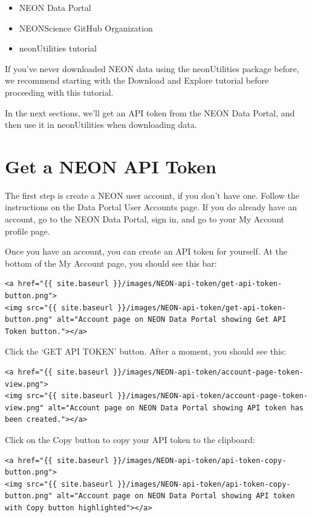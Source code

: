 \documentclass[]{book}
\providecommand{\tightlist}{%
  \setlength{\itemsep}{0pt}\setlength{\parskip}{0pt}}
\begin{document}
\begin{itemize}
\tightlist
\item
  NEON Data Portal 
\item
  NEONScience GitHub Organization
\item
  neonUtilities tutorial
\end{itemize}

If you've never downloaded NEON data using the neonUtilities package before,
we recommend starting with the Download and Explore tutorial before proceeding with this tutorial.

In the next sections, we'll get an API token from the NEON Data Portal, and
then use it in neonUtilities when downloading data.

\hypertarget{get-a-neon-api-token}{%
\section{Get a NEON API Token}\label{get-a-neon-api-token}}

The first step is create a NEON user account, if you don't have one.
Follow the instructions on the Data Portal User Accounts page. If you do already
have an account, go to the NEON Data Portal,
sign in, and go to your My Account profile page.

Once you have an account, you can create an API token for yourself. At
the bottom of the My Account page, you should see this bar:

\begin{verbatim}
<a href="{{ site.baseurl }}/images/NEON-api-token/get-api-token-button.png">
<img src="{{ site.baseurl }}/images/NEON-api-token/get-api-token-button.png" alt="Account page on NEON Data Portal showing Get API Token button."></a>
\end{verbatim}

Click the `GET API TOKEN' button. After a moment, you should see this:

\begin{verbatim}
<a href="{{ site.baseurl }}/images/NEON-api-token/account-page-token-view.png">
<img src="{{ site.baseurl }}/images/NEON-api-token/account-page-token-view.png" alt="Account page on NEON Data Portal showing API token has been created."></a>
\end{verbatim}

Click on the Copy button to copy your API token to the clipboard:

\begin{verbatim}
<a href="{{ site.baseurl }}/images/NEON-api-token/api-token-copy-button.png">
<img src="{{ site.baseurl }}/images/NEON-api-token/api-token-copy-button.png" alt="Account page on NEON Data Portal showing API token with Copy button highlighted"></a>
\end{verbatim}
\end{document}
